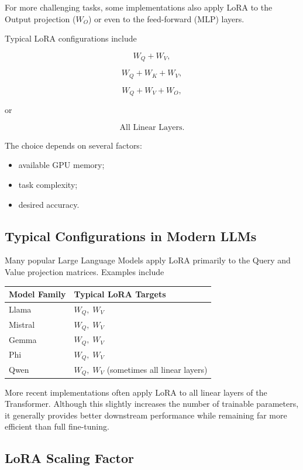 For more challenging tasks, some implementations also apply LoRA to the Output projection ($W_O$) or even to the feed-forward (MLP) layers.

Typical LoRA configurations include

\[
W_Q + W_V,
\]

\[
W_Q + W_K + W_V,
\]

\[
W_Q + W_V + W_O,
\]

or

\[
\text{All Linear Layers}.
\]

The choice depends on several factors:

\begin{itemize}
    \item available GPU memory;
    \item task complexity;
    \item desired accuracy.
\end{itemize}
\subsection*{Typical Configurations in Modern LLMs}

Many popular Large Language Models apply LoRA primarily to the Query and Value projection matrices. Examples include

\begin{center}
\renewcommand{\arraystretch}{1.2}
\begin{tabular}{ll}
\toprule
\textbf{Model Family} & \textbf{Typical LoRA Targets} \\
\midrule
Llama & $W_Q,\;W_V$ \\
Mistral & $W_Q,\;W_V$ \\
Gemma & $W_Q,\;W_V$ \\
Phi & $W_Q,\;W_V$ \\
Qwen & $W_Q,\;W_V$ (sometimes all linear layers) \\
\bottomrule
\end{tabular}
\end{center}

More recent implementations often apply LoRA to all linear layers of the Transformer. Although this slightly increases the number of trainable parameters, it generally provides better downstream performance while remaining far more efficient than full fine-tuning.
\subsection*{LoRA Scaling Factor}

